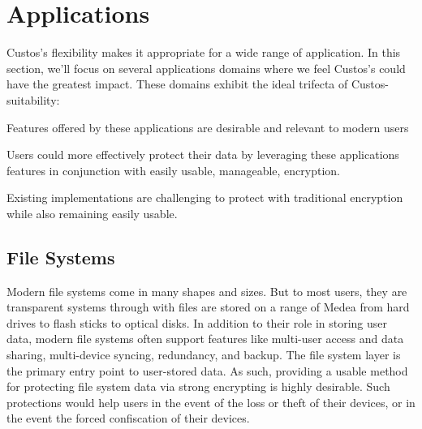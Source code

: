 \section{Applications}

Custos's flexibility makes it appropriate for a wide range of
application. In this section, we'll focus on several applications
domains where we feel Custos's could have the greatest impact. These
domains exhibit the ideal trifecta of Custos-suitability:

\begin{packed_item}
\item Features offered by these applications are desirable and relevant
  to modern users
\item Users could more effectively protect their data by leveraging
  these applications features in conjunction with easily usable,
  manageable, encryption.
\item Existing implementations are challenging to protect with traditional
  encryption while also remaining easily usable.
\end{packed_item}

\subsection{File Systems}

Modern file systems come in many shapes and sizes. But to most users,
they are transparent systems through with files are stored on a range
of Medea from hard drives to flash sticks to optical disks. In
addition to their role in storing user data, modern file systems often
support features like multi-user access and data sharing, multi-device
syncing, redundancy, and backup. The file system layer is the
primary entry point to user-stored data. As such, providing a usable
method for protecting file system data via strong encrypting is highly
desirable. Such protections would help users in the event of the loss
or theft of their devices, or in the event the forced confiscation of
their devices.

